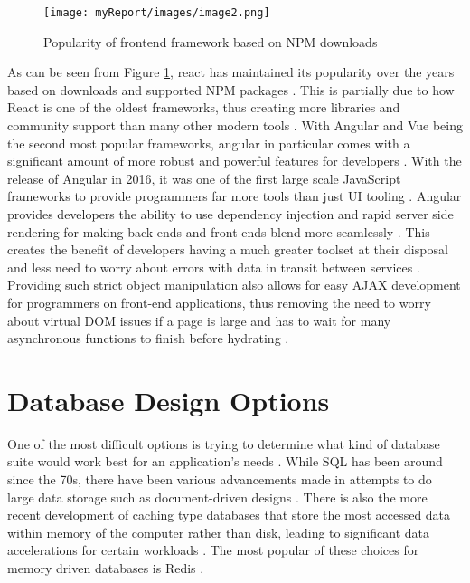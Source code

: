 \pagebreak
\begin{figure}[H]
\texttt{[image: myReport/images/image2.png]}
\caption{Popularity of frontend framework based on NPM downloads \cite{Krotoff}}
\label{fig:npmPop}
\end{figure}

As can be seen from Figure \ref{fig:npmPop}, react has maintained its popularity over the years based on downloads and supported NPM packages \cite{Krotoff}. This is partially due to how React is one of the oldest frameworks, thus creating more libraries and community support than many other modern tools \cite{Krotoff}. With Angular and Vue being the second most popular frameworks, angular in particular comes with a significant amount of more robust and powerful features for developers \cite{Xu_2021}.
\newline
\newline
With the release of Angular in 2016, it was one of the first large scale JavaScript frameworks to provide programmers far more tools than just UI tooling \cite{Dhaduk_2023}. Angular provides developers the ability to use dependency injection and rapid server side rendering for making back-ends and front-ends blend more seamlessly \cite{Dhaduk_2023, Xu_2021}. This creates the benefit of developers having a much greater toolset at their disposal and less need to worry about errors with data in transit between services \cite{Dhaduk_2023}. Providing such strict object manipulation also allows for easy AJAX development for programmers on front-end applications, thus removing the need to worry about virtual DOM issues if a page is large and has to wait for many asynchronous functions to finish before hydrating \cite{Dhaduk_2023, Xu_2021}.

\section{Database Design Options}

One of the most difficult options is trying to determine what kind of database suite would work best for an application’s needs \cite{Li_Manoharan_2013}.  While SQL has been around since the 70s, there have been various advancements made in attempts to do large data storage such as document-driven designs \cite{Chen_Tang_Wang_Zhao_Guo_2016, Li_Manoharan_2013}. There is also the more recent development of caching type databases that store the most accessed data within memory of the computer rather than disk, leading to significant data accelerations for certain workloads \cite{Li_Manoharan_2013}. The most popular of these choices for memory driven databases is Redis \cite{Chen_Tang_Wang_Zhao_Guo_2016}.

